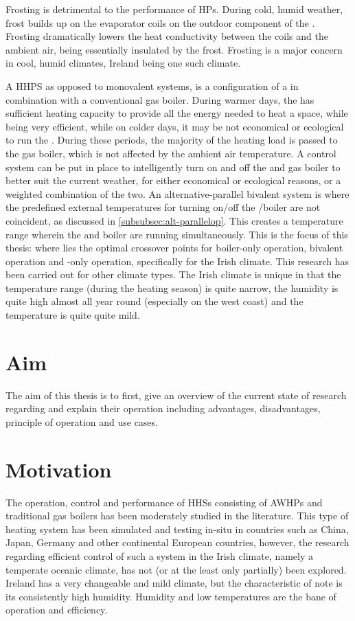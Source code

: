 Frosting is detrimental to the performance of \acp{HP}. During cold, humid weather, frost builds up on the evaporator coils on the outdoor component of the \HP. Frosting dramatically lowers the heat conductivity between the coils and the ambient air, being essentially insulated by the frost. Frosting is a major concern in cool, humid climates, Ireland being one such climate.

A \ac{HHPS} as opposed to monovalent systems, is a configuration of a \HP in combination with a conventional gas boiler. During warmer days, the \HP has sufficient heating capacity to provide all the energy needed to heat a space, while being very efficient, while on colder days, it may be not economical or ecological to run the \HP. During these periods, the majority of the heating load is passed to the gas boiler, which is not affected by the ambient air temperature. A control system can be put in place to intelligently turn on and off the \HP and gas boiler to better suit the current weather, for either economical or ecological reasons, or a weighted combination of the two. An alternative-parallel bivalent system is where the predefined external temperatures for turning on/off the \HP/boiler are not coincident, as discussed in \cref{subsubsec:alt-parallelop}. This creates a temperature range wherein the \HP and boiler are running simultaneously. This is the focus of this thesis: where lies the optimal crossover points for boiler-only operation, bivalent operation and \HP-only operation, specifically for the Irish climate. This research has been carried out for other climate types. The Irish climate is unique in that the temperature range (during the heating season) is quite narrow, the humidity is quite high almost all year round (especially on the west coast) and the temperature is quite quite mild.  

\section{Aim}
The aim of this thesis is to first, give an overview of the current state of research regarding \HPs and explain their operation including advantages, disadvantages, principle of operation and use cases. 

\section{Motivation}
The operation, control and performance of \acp{HHS} consisting of \acp{AWHP} and traditional gas boilers has been moderately studied in the literature. This type of heating system has been simulated and testing in-situ in countries such as China, Japan, Germany and other continental European countries, however, the research regarding efficient control of such a system in the Irish climate, namely a temperate oceanic climate, has not (or at the least only partially) been explored. Ireland has a very changeable and mild climate, but the characteristic of note is its consistently high humidity. Humidity and low temperatures are the bane of \HP operation and efficiency.

